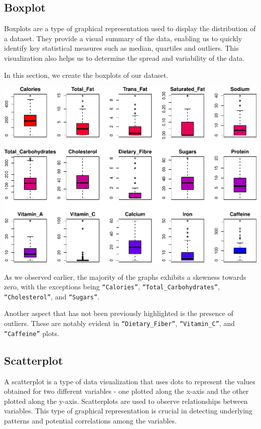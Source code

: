 \documentclass[
]{article}
\begin{document}
\subsection{Boxplot}\label{boxplot}

Boxplots are a type of graphical representation used to display the
distribution of a dataset. They provide a visual summary of the data,
enabling us to quickly identify key statistical measures such as median,
quartiles and outliers. This visualization also helps us to determine
the spread and variability of the data.

In this section, we create the boxplots of our dataset.

\begin{center}\includegraphics{Statistical_Learning_Final_Report_files/figure-latex/boxplot-1} \end{center}

As we observed earlier, the majority of the graphs exhibits a skewness
towards zero, with the exceptions being \texttt{“Calories”},
\texttt{“Total\_Carbohydrates”}, \texttt{“Cholesterol”}, and
\texttt{“Sugars”}.

Another aspect that has not been previously highlighted is the presence
of outliers. These are notably evident in \texttt{“Dietary\_Fiber”},
\texttt{“Vitamin\_C”}, and \texttt{“Caffeine”} plots.

\subsection{Scatterplot}\label{scatterplot}

A scatterplot is a type of data visualization that uses dots to
represent the values obtained for two different variables - one plotted
along the x-axis and the other plotted along the y-axis. Scatterplots
are used to observe relationships between variables. This type of
graphical representation is crucial in detecting underlying patterns and
potential correlations among the variables.
\end{document}
